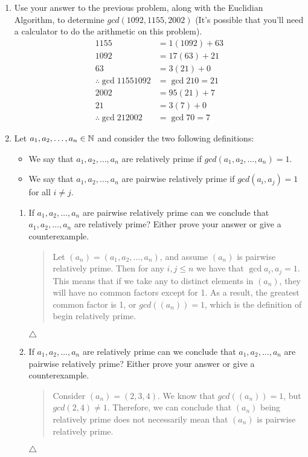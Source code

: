 \documentclass{hw}
\begin{document}
\begin{enumerate}
\item Use your answer to the previous problem, along with the Euclidian Algorithm, to determine
$gcd(1092,1155,2002)$ (It's possible that you'll need a calculator to do the arithmetic on this
problem).
\begin{align*}
1155 &= 1(1092) + 63\\
1092 &= 17(63) + 21\\
63 &= 3(21) + 0\\
\therefore\gcd{1155}{1092} &= \gcd{21}{0} = 21\\
2002 &= 95(21) + 7\\
21 &= 3(7) + 0\\
\therefore\gcd{21}{2002} &= \gcd{7}{0} = 7
\end{align*}

\item Let $a_{1},a_{2},\dots,a_{n} \in \mathbb{N}$ and consider the two following definitions:
\begin{itemize}
\item We say that $a_{1},a_{2},\dots,a_{n}$ are relatively prime if
$gcd(a_{1},a_{2},\dots,a_{n}) = 1$.
\item We say that $a_{1},a_{2},\dots,a_{n}$ are pairwise relatively prime if
$gcd(a_{i},a_{j}) = 1$ for all $i\neq j$.
\end{itemize}
\begin{enumerate}
\item If $a_{1}, a_{2},\dots,a_{n}$ are pairwise relatively prime can we conclude that
$a_{1}, a_{2},\dots,a_{n}$ are relatively prime? Either prove your answer or give a counterexample.
\begin{quote}
Let $(a_{n}) = (a_{1},a_{2},\dots,a_{n})$, and assume $(a_{n})$ is pairwise relatively prime.
Then for any $i,j \leq n$ we have that $\gcd{a_{i},a_{j}} = 1$. This means that if we take any
to distinct elements in $(a_{n})$, they will have no common factors except for 1. As a result, the
greatest common factor is 1, or $gcd((a_{n})) = 1$, which is the definition of begin relatively
prime.
\end{quote}
$\triangle$
\item If $a_{1}, a_{2},\dots,a_{n}$ are relatively prime can we conclude that $a_{1},
a_{2},\dots,a_{n}$ are pairwise relatively prime? Either prove your answer or give a
counterexample.
\begin{quote}
Consider $(a_{n}) = (2,3,4)$. We know that $gcd((a_{n})) = 1$, but $gcd(2,4)\neq 1$.
Therefore, we can conclude that $(a_{n})$ being relatively prime does not necessarily
mean that $(a_{n})$ is pairwise relatively prime.
\end{quote}
$\triangle$
\end{enumerate}


\end{enumerate}
\end{document}
